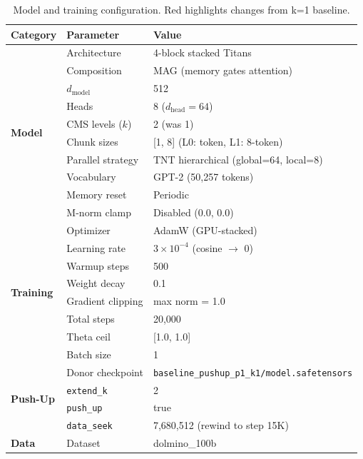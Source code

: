 \documentclass[11pt,a4paper]{article}
\begin{document}
\begin{table}[H]
\centering
\caption{Model and training configuration. \textcolor{nlred}{Red} highlights changes from k=1 baseline.}
\label{tab:config}
\begin{tabular}{@{}lll@{}}
\toprule
\textbf{Category} & \textbf{Parameter} & \textbf{Value} \\
\midrule
\multirow{10}{*}{\textbf{Model}}
    & Architecture      & 4-block stacked Titans \\
    & Composition       & MAG (memory gates attention) \\
    & $d_\text{model}$  & 512 \\
    & Heads             & 8 ($d_\text{head} = 64$) \\
    & \textcolor{nlred}{CMS levels ($k$)} & \textcolor{nlred}{2 (was 1)} \\
    & \textcolor{nlred}{Chunk sizes}      & \textcolor{nlred}{[1, 8] (L0: token, L1: 8-token)} \\
    & Parallel strategy & TNT hierarchical (global=64, local=8) \\
    & Vocabulary        & GPT-2 (50{,}257 tokens) \\
    & Memory reset      & Periodic \\
    & M-norm clamp      & Disabled (0.0, 0.0) \\
\midrule
\multirow{8}{*}{\textbf{Training}}
    & Optimizer         & AdamW (GPU-stacked) \\
    & Learning rate     & $3 \times 10^{-4}$ (cosine $\to$ 0) \\
    & Warmup steps      & 500 \\
    & Weight decay      & 0.1 \\
    & Gradient clipping & max norm = 1.0 \\
    & Total steps       & 20{,}000 \\
    & Theta ceil        & [1.0, 1.0] \\
    & Batch size        & 1 \\
\midrule
\multirow{4}{*}{\textbf{Push-Up}}
    & \textcolor{nlred}{Donor checkpoint} & \textcolor{nlred}{\texttt{baseline\_pushup\_p1\_k1/model.safetensors}} \\
    & \textcolor{nlred}{\texttt{extend\_k}} & \textcolor{nlred}{2} \\
    & \textcolor{nlred}{\texttt{push\_up}} & \textcolor{nlred}{true} \\
    & \textcolor{nlred}{\texttt{data\_seek}} & \textcolor{nlred}{7{,}680{,}512 (rewind to step 15K)} \\
\midrule
\textbf{Data}
    & Dataset           & dolmino\_100b \\
\bottomrule
\end{tabular}
\end{table}
\end{document}
